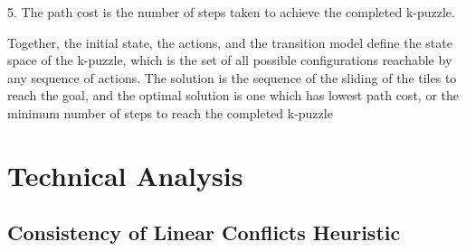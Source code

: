 \documentclass[runningheads]{llncs}
\begin{document}
5. The path cost is the number of steps taken to achieve the completed k-puzzle.

Together, the initial state, the actions, and the transition model define the state space of the k-puzzle, which is the set of all possible configurations reachable by any sequence of actions. The solution is the sequence of the sliding of the tiles to reach the goal, and the optimal solution is one which has lowest path cost, or the minimum number of steps to reach the completed k-puzzle

\section{Technical Analysis}

\subsection{Consistency of Linear Conflicts Heuristic}
\end{document}
